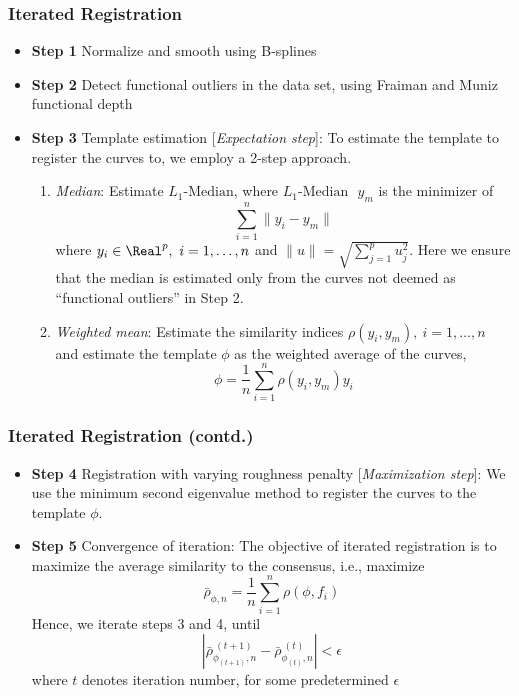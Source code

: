 \documentclass[10pt,dvipsnames,table]{beamer}
\begin{document}
\begin{frame}
\frametitle{Iterated Registration}
\begin{itemize}
\item {\bf{Step 1}} Normalize and smooth using B-splines
\item {\bf{Step 2}} Detect functional outliers in the data set, using Fraiman and Muniz functional depth
\item {\bf{Step 3}} Template estimation [{\emph{Expectation step}}]: To estimate the template to register the curves to, we employ a 2-step approach. 
\begin{enumerate}
\item {\emph{Median}}: Estimate $L_1\text{-Median}$, where $L_1\text{-Median }$ $y_m$ is the minimizer of 
\[ \sum\limits_{i = 1}^n \|y_i - y_m \| \]
where $y_i \in \Real^p, \ i = 1,\dots,n$ and $\|u \| = \sqrt{\sum\limits_{j = 1}^p u_j^2}$. Here we ensure that the median is estimated only from the curves not deemed as ``functional outliers'' in Step 2. 
\item {\emph{Weighted mean}}: Estimate the similarity indices $\rho(y_i, y_m), \ i = 1,\dots,n$ and estimate the template $\phi$ as the weighted average of the curves, 
\[ \phi = \frac{1}{n}\sum\limits_{i = 1}^n \rho(y_i, y_m) y_i \]
\end{enumerate}
\end{itemize}
\end{frame}

\begin{frame}
\frametitle{Iterated Registration (contd.)}
\begin{itemize}
\item {\bf{Step 4}} Registration with varying roughness penalty [{\emph{Maximization step}}]: We use the minimum second eigenvalue method to register the curves to the template $\phi$. 
\item {\bf{Step 5}} Convergence of iteration: The objective of iterated registration is to maximize the average similarity to the consensus, i.e., maximize 
\[ \bar{\rho}_{\phi, n} = \frac{1}{n} \sum \limits_{i = 1}^{n} \rho(\phi, f_i)\]
Hence, we iterate steps 3 and 4, until
\[ |\bar{\rho}_{\phi_{(t+1)}, n}^{\ (t+1)} - \bar{\rho}_{\phi_{(t)}, n}^{ \ (t)} | < \epsilon \]
where $t$ denotes iteration number, for some predetermined $\epsilon$
\end{itemize}
\end{frame}
\end{document}

